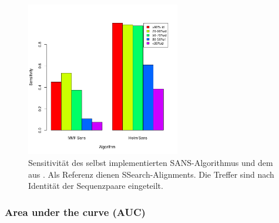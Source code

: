 \documentclass{article}
\begin{document}
\begin{figure}[h]
  \begin{center}
    \includegraphics[width=0.6\textwidth]{img/barplot_beide.png}
    \caption{Sensitivität des selbst implementierten SANS-Algorithmus und dem aus \cite{Holm}. Als Referenz dienen SSearch-Alignments.
    Die Treffer sind nach Identität der Sequenzpaare eingeteilt.}
    \label{barplot}
  \end{center}
\end{figure}

\subsubsection{Area under the curve (AUC)}
\end{document}
